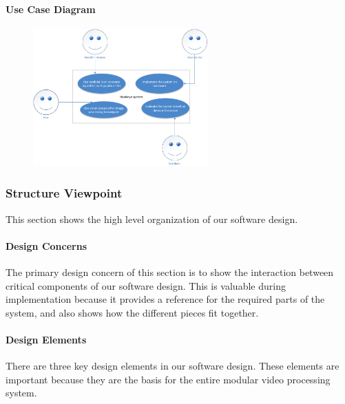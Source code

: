 	\paragraph{Use Case Diagram}
		\begin{figure}[H] %
		\centering
		\includegraphics[width=0.6\textwidth,natwidth=610,natheight=642]{images/UseCase_Diagram.png}  
		\end{figure}
	
\subsubsection{Structure Viewpoint}
This section shows the high level organization of our software design.  
	\paragraph{Design Concerns}
	The primary design concern of this section is to show the interaction between critical components of our software design. This is valuable during implementation because it provides a reference for the required parts of the system, and also shows how the different pieces fit together.\\
	\paragraph{Design Elements}
	There are three key design elements in our software design. These elements are important because they are the basis for the entire modular video processing system.\\
	
